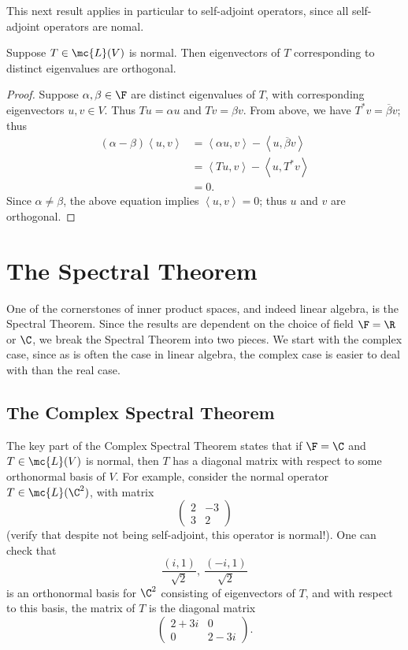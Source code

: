 \documentclass[math0540-lecture-notes.tex]{subfiles}
\begin{document}
This next result applies in particular to self-adjoint operators, since all self-adjoint operators
are nomal.
\begin{proposition}{}
  Suppose $T\in \mc{L}(V)$ is normal. Then eigenvectors of $T$ corresponding to distinct eigenvalues
  are orthogonal.
\end{proposition}
\begin{proof}[Proof]
  Suppose $\alpha,\beta \in \F$ are distinct eigenvalues of $T$, with corresponding eigenvectors
  $u,v\in V$. Thus $Tu=\alpha u$ and $Tv=\beta v$. From above, we have $T^*v=\overline{\beta}v$;
  thus 
  \begin{align*}
    (\alpha-\beta)\left<u,v \right> &= \left<\alpha u,v \right>-\left<u,\overline{\beta}v \right>   \\
                                    &= \left<Tu,v \right> -\left<u,T^*v \right>  \\
                                    &= 0
  .\end{align*} Since $\alpha\neq \beta$, the above equation implies $\left<u,v \right> =0$; thus
  $u$ and $v$ are orthogonal.
\end{proof}

\section{The Spectral Theorem}
One of the cornerstones of inner product spaces, and indeed linear algebra, is the Spectral Theorem.
Since the results are dependent on the choice of field $\F=\R$ or $\C$, we break the Spectral
Theorem into two pieces. We start with the complex case, since as is often the case in linear
algebra, the complex case is easier to deal with than the real case.

\subsection{The Complex Spectral Theorem}
The key part of the Complex Spectral Theorem states that if $\F=\C$ and $T\in \mc{L}(V)$ is normal,
then $T$ has a diagonal matrix with respect to some orthonormal basis of $V$. For example, consider
the normal operator $T\in \mc{L}(\C^2)$, with matrix \[
  \begin{pmatrix} 2&-3\\3&2 \end{pmatrix} 
\] (verify that despite not being self-adjoint, this operator is normal!). One can check that \[
\frac{(i,1)}{\sqrt{2}},\ \frac{(-i,1)}{\sqrt{2}}
\] is an orthonormal basis for $\C^2$ consisting of eigenvectors of $T$, and with respect to this
basis, the matrix of $T$ is the diagonal matrix \[
  \begin{pmatrix} 2+3i&0\\0&2-3i \end{pmatrix} 
.\] 
\end{document}

